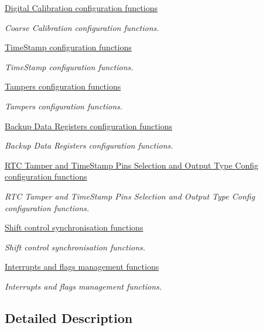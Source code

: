 \begin{DoxyCompactItemize}
\hyperlink{group___r_t_c___group7}{Digital Calibration configuration functions}
\begin{DoxyCompactList}\small\item\em Coarse Calibration configuration functions. \end{DoxyCompactList}\item 
\hyperlink{group___r_t_c___group8}{Time\-Stamp configuration functions}
\begin{DoxyCompactList}\small\item\em Time\-Stamp configuration functions. \end{DoxyCompactList}\item 
\hyperlink{group___r_t_c___group9}{Tampers configuration functions}
\begin{DoxyCompactList}\small\item\em Tampers configuration functions. \end{DoxyCompactList}\item 
\hyperlink{group___r_t_c___group10}{Backup Data Registers configuration functions}
\begin{DoxyCompactList}\small\item\em Backup Data Registers configuration functions. \end{DoxyCompactList}\item 
\hyperlink{group___r_t_c___group11}{R\-T\-C Tamper and Time\-Stamp Pins Selection and Output Type Config configuration functions}
\begin{DoxyCompactList}\small\item\em R\-T\-C Tamper and Time\-Stamp Pins Selection and Output Type Config configuration functions. \end{DoxyCompactList}\item 
\hyperlink{group___r_t_c___group12}{Shift control synchronisation functions}
\begin{DoxyCompactList}\small\item\em Shift control synchronisation functions. \end{DoxyCompactList}\item 
\hyperlink{group___r_t_c___group13}{Interrupts and flags management functions}
\begin{DoxyCompactList}\small\item\em Interrupts and flags management functions. \end{DoxyCompactList}\end{DoxyCompactItemize}


\subsection{Detailed Description}
